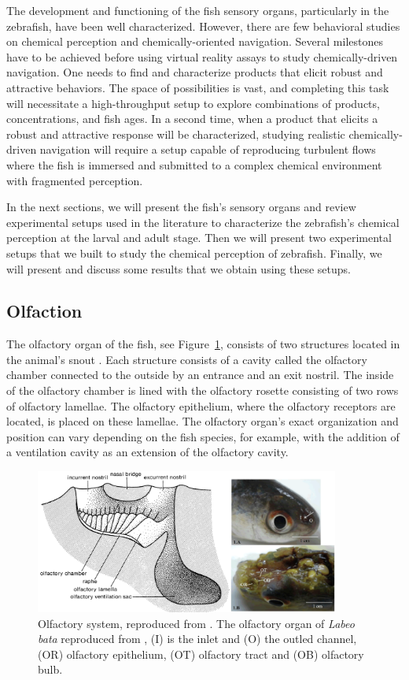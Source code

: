   The development and functioning of the fish sensory organs, particularly in the zebrafish, have been well characterized. However, there are few behavioral studies on chemical perception and chemically-oriented navigation. Several milestones have to be achieved before using virtual reality assays to study chemically-driven navigation. One needs to find and characterize products that elicit robust and attractive behaviors. The space of possibilities is vast, and completing this task will necessitate a high-throughput setup to explore combinations of products, concentrations, and fish ages. In a second time, when a product that elicits a robust and attractive response will be characterized, studying realistic chemically-driven navigation will require a setup capable of reproducing turbulent flows where the fish is immersed and submitted to a complex chemical environment with fragmented perception.

  In the next sections, we will present the fish's sensory organs and review experimental setups used in the literature to characterize the zebrafish's chemical perception at the larval and adult stage. Then we will present two experimental setups that we built to study the chemical perception of zebrafish. Finally, we will present and discuss some results that we obtain using these setups.


    \subsection{Olfaction}
    The olfactory organ of the fish, see Figure~\ref{olfactory_schematic}, consists of two structures located in the animal's snout \cite{hara2012fish}. Each structure consists of a cavity called the olfactory chamber connected to the outside by an entrance and an exit nostril. The inside of the olfactory chamber is lined with the olfactory rosette consisting of two rows of olfactory lamellae. The olfactory epithelium, where the olfactory receptors are located, is placed on these lamellae. The olfactory organ's exact organization and position can vary depending on the fish species, for example, with the addition of a ventilation cavity as an extension of the olfactory cavity.

    \begin{figure}[h]
      \centering
      \includegraphics[width=10cm]{part_2/assets/olfactory_schematic.png}
      \caption{Olfactory system, reproduced from \cite{hara2012fish}. The olfactory organ of \textit{Labeo bata} reproduced from \cite{samajdar2016histological}, (I) is the inlet and (O) the outled channel, (OR) olfactory epithelium, (OT) olfactory tract and (OB) olfactory bulb.}
      \label{olfactory_schematic}
    \end{figure}


